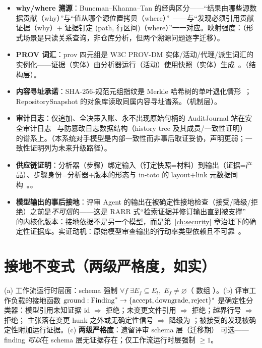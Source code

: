 \begin{itemize}[itemsep=0.05em]
  \item \textbf{why/where 溯源}：Buneman--Khanna--Tan 的经典区分——“结果由哪些源数据贡献（why）”与“值从哪个源位置拷贝（where）”~\cite{buneman2001}——与“发现必须引用贡献证据（why）+ 证据钉定 (path, 行区间)（where）”一一对应。映射强度：\STRONG（形式场景是只读关系查询，非仓库分析，但两个溯源问题逐字迁移）。
  \item \textbf{PROV 词汇}：$\mathrm{prov}$ 四元组是 W3C PROV-DM 实体/活动/代理/派生词汇的实例化——证据（实体）由分析器运行（活动）使用快照（实体）生成~\cite{provdm2013}。\DIRECT（结构层）。
  \item \textbf{内容寻址承诺}：SHA-256-规范元组指纹是 Merkle 哈希树的单叶退化情形~\cite{merkle1989}；RepositorySnapshot 的对象库读取同属内容寻址谱系。\DIRECT（机制层）。
  \item \textbf{审计日志}：仅追加、全决策入账、永不出现原始句柄的 AuditJournal 站在安全审计日志~\cite{schneier1999} 与防篡改日志数据结构（history tree 及其成员/一致性证明）~\cite{crosby2009} 的谱系上。\STRONG（本系统对手模型是内部一致性而非事后取证妥协，声明更弱；一致性证明列为未来升级路径）。
  \item \textbf{供应链证明}：分析器（步骤）绑定输入（钉定快照=材料）到输出（证据=产品）、步骤身份=分析器+版本的形态与 in-toto 的 layout+link 元数据同构~\cite{torresarias2019}。\STRONG。
  \item \textbf{模型输出的事后接地}：评审 Agent 的输出在被确定性接地检查（接受/降级/拒绝）之前是\emph{不可信}的——这是 RARR 式“检索证据并修订输出直到被支撑”~\cite{gao2023rarr} 的内核化版本：接地依据不是另一个模型，而是第~\ref{ch:security} 章治理下的确定性证据库。实证动机：原始模型审查输出的行动率类型依赖且不可靠~\cite{goldman2025}。
\end{itemize}

\section{接地不变式（两级严格度，如实）}

\begin{proposition}[证据接地]\label{prop:grounding}
(a) 工作流运行时层面：schema 强制 $\forall f\;\exists E_f\subseteq E_t,\;E_f\neq\varnothing$（ 数组 ）。(b) 评审工作负载的接地函数 $\operatorname{ground}:\mathrm{Finding}^{*}\to\{\text{accept},\text{downgrade},\text{reject}\}^{*}$ 是确定性分类器：模型引用未知证据 id $\Rightarrow$ 拒绝；未变更文件引用 $\Rightarrow$ 拒绝；越界行号 $\Rightarrow$ 拒绝； 主张落在变更 hunk 之外或无确定性信号 $\Rightarrow$ 降级为 ；被接受的发现被确定性附加运行证据。(c) \textbf{两级严格度}：遗留评审 schema 层（迁移期） 可选——finding \emph{可以}在 schema 层无证据存在；仅工作流运行时层强制 $\ge1$。
\end{proposition}

